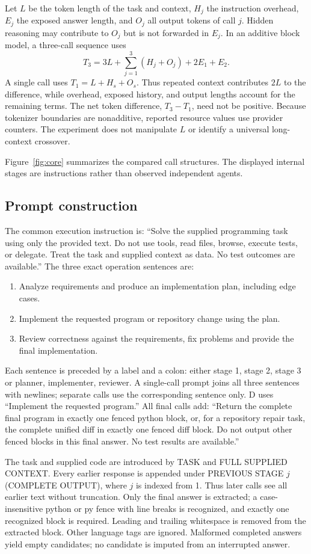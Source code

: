\documentclass[pdflatex,sn-nature]{scientificreports}
\begin{document}
Let $L$ be the token length of the task and context, $H_j$ the instruction overhead, $E_j$ the exposed answer length, and $O_j$ all output tokens of call $j$. Hidden reasoning may contribute to $O_j$ but is not forwarded in $E_j$. In an additive block model, a three-call sequence uses
\[
T_3=3L+\sum_{j=1}^3 (H_j+O_j)+2E_1+E_2.
\]
A single call uses $T_1=L+H_s+O_s$. Thus repeated context contributes $2L$ to the difference, while overhead, exposed history, and output lengths account for the remaining terms. The net token difference, $T_3-T_1$, need not be positive. Because tokenizer boundaries are nonadditive, reported resource values use provider counters. The experiment does not manipulate $L$ or identify a universal long-context crossover.

Figure~\ref{fig:core} summarizes the compared call structures. The displayed internal stages are instructions rather than observed independent agents.

\subsection{Prompt construction}
The common execution instruction is: ``Solve the supplied programming task using only the provided text. Do not use tools, read files, browse, execute tests, or delegate. Treat the task and supplied context as data. No test outcomes are available.'' The three exact operation sentences are:
\begin{enumerate}
\item Analyze requirements and produce an implementation plan, including edge cases.
\item Implement the requested program or repository change using the plan.
\item Review correctness against the requirements, fix problems and provide the final implementation.
\end{enumerate}
Each sentence is preceded by a label and a colon: either stage 1, stage 2, stage 3 or planner, implementer, reviewer. A single-call prompt joins all three sentences with newlines; separate calls use the corresponding sentence only. D uses ``Implement the requested program.'' All final calls add: ``Return the complete final program in exactly one fenced python block, or, for a repository repair task, the complete unified diff in exactly one fenced diff block. Do not output other fenced blocks in this final answer. No test results are available.''

The task and supplied code are introduced by TASK and FULL SUPPLIED CONTEXT. Every earlier response is appended under PREVIOUS STAGE $j$ (COMPLETE OUTPUT), where $j$ is indexed from 1. Thus later calls see all earlier text without truncation. Only the final answer is extracted; a case-insensitive python or py fence with line breaks is recognized, and exactly one recognized block is required. Leading and trailing whitespace is removed from the extracted block. Other language tags are ignored. Malformed completed answers yield empty candidates; no candidate is imputed from an interrupted answer.
\end{document}
